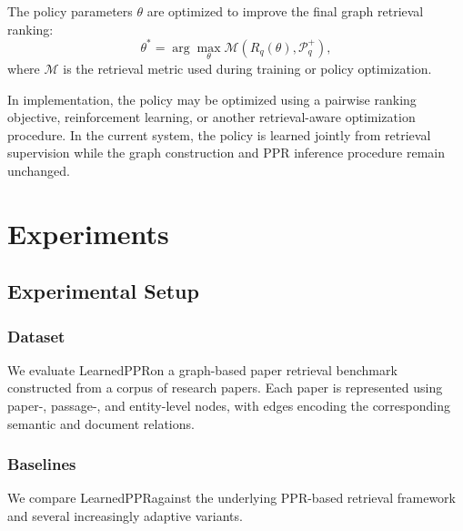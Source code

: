 \documentclass[conference]{IEEEtran}
\newcommand{\method}{LearnedPPR}
\newcommand{\q}{q}
\begin{document}
The policy parameters $\theta$ are optimized to improve the final
graph retrieval ranking:
\begin{equation}
\theta^{*}
=
\arg\max_{\theta}
\mathcal{M}
\left(
R_{\q}(\theta),
\mathcal{P}^{+}_{\q}
\right),
\label{eq:objective}
\end{equation}
where $\mathcal{M}$ is the retrieval metric used during training or
policy optimization.

In implementation, the policy may be optimized using a pairwise
ranking objective, reinforcement learning, or another retrieval-aware
optimization procedure. In the current system, the policy is learned
jointly from retrieval supervision while the graph construction and
PPR inference procedure remain unchanged.



\section{Experiments}

\subsection{Experimental Setup}

\subsubsection{Dataset}

We evaluate \method on a graph-based paper retrieval benchmark
constructed from a corpus of research papers. Each paper is
represented using paper-, passage-, and entity-level nodes, with
edges encoding the corresponding semantic and document relations.


\subsubsection{Baselines}

We compare \method against the underlying PPR-based retrieval
framework and several increasingly adaptive variants.
\end{document}
